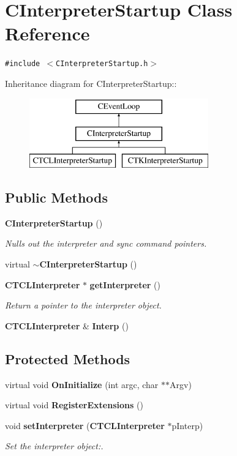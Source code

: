 \section{CInterpreter\-Startup  Class Reference}
\label{classCInterpreterStartup}
{\tt \#include $<$CInterpreter\-Startup.h$>$}

Inheritance diagram for CInterpreter\-Startup::\begin{figure}[H]
\begin{center}
\leavevmode
\includegraphics[height=3cm]{classCInterpreterStartup}
\end{center}
\end{figure}
\subsection*{Public Methods}
\begin{CompactItemize}
\item 
{\bf CInterpreter\-Startup} ()
\begin{CompactList}\small\item\em Nulls out the interpreter and sync command pointers.\item\end{CompactList}\item 
virtual {\bf $\sim$CInterpreter\-Startup} ()
\item 
{\bf CTCLInterpreter} $\ast$ {\bf get\-Interpreter} ()
\begin{CompactList}\small\item\em Return a pointer to the interpreter object.\item\end{CompactList}\item 
{\bf CTCLInterpreter} \& {\bf Interp} ()
\end{CompactItemize}
\subsection*{Protected Methods}
\begin{CompactItemize}
\item 
virtual void {\bf On\-Initialize} (int argc, char $\ast$$\ast$Argv)
\item 
virtual void {\bf Register\-Extensions} ()
\item 
void {\bf set\-Interpreter} ({\bf CTCLInterpreter} $\ast$p\-Interp)
\begin{CompactList}\small\item\em Set the interpreter object:.\item\end{CompactList}\end{CompactItemize}
